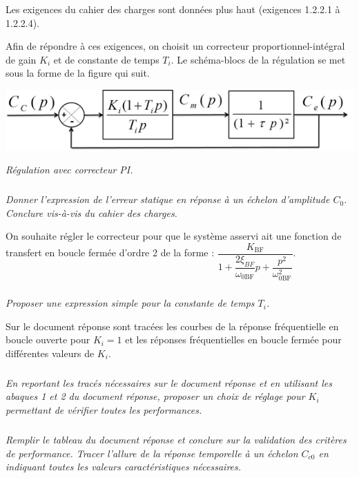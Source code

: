 \documentclass[10pt,fleqn]{article} %
\begin{document}
Les exigences du cahier des charges sont données plus haut (exigences 1.2.2.1 à 1.2.2.4).

Afin de répondre à ces exigences, on choisit un correcteur proportionnel-intégral de gain $K_i$ et de constante de temps $T_i$. Le schéma-blocs de la régulation se met sous la forme de la figure qui suit.

\begin{center}
\includegraphics[width=.55\linewidth]{images/fig_08}

\textit{Régulation avec correcteur PI.}
\end{center}


\subparagraph{}
\textit{Donner l’expression de l’erreur statique en réponse à un échelon d'amplitude $C_0$. Conclure vis-à-vis du cahier des charges.}
\ifprof
\begin{corrige}
\end{corrige}
\else
\fi

\vspace{.25cm}

On souhaite régler le correcteur pour que le système asservi ait une fonction de transfert en boucle fermée
d’ordre 2 de la forme :
$\dfrac{K_{\text{BF}}}{1+\dfrac{2\xi_{BF}}{\omega_{0\text{BF}}}p+\dfrac{p^2}{\omega_{0\text{BF}}^2}}$.


\subparagraph{}
\textit{Proposer une expression simple pour la constante de temps $T_i$.}
\ifprof
\begin{corrige}
\end{corrige}
\else
\fi

Sur le document réponse sont tracées les courbes de la réponse fréquentielle en boucle ouverte pour
$K_i=1$ et les réponses fréquentielles en boucle fermée pour différentes valeurs de $K_i$.


\subparagraph{}
\textit{En reportant les tracés nécessaires sur le document réponse et en utilisant les abaques 1 et 2 du
document réponse, proposer un choix de réglage pour $K_i$ permettant de vérifier toutes les
performances.}
\ifprof
\begin{corrige}
\end{corrige}
\else
\fi


\subparagraph{}
\textit{Remplir le tableau du document réponse et conclure sur la validation des critères de performance.
Tracer l’allure de la réponse temporelle à un échelon $C_{c0}$ en indiquant toutes les valeurs caractéristiques
nécessaires.}
\end{document}
